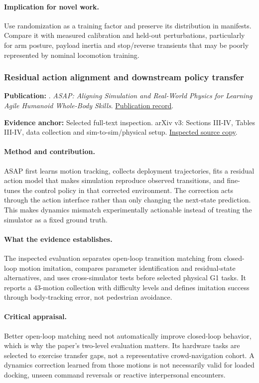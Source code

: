 \paragraph{Implication for novel work.} Use randomization as a training factor and preserve its distribution in manifests. Compare it with measured calibration and held-out perturbations, particularly for arm posture, payload inertia and stop/reverse transients that may be poorly represented by nominal locomotion training.

\subsubsection{Residual action alignment and downstream policy transfer}\label{paper:asap}
\textbf{Publication:} \citet{asap}. \emph{ASAP: Aligning Simulation and Real-World Physics for Learning Agile Humanoid Whole-Body Skills}. \href{https://arxiv.org/abs/2502.01143v3}{Publication record}.

\textbf{Evidence anchor:} Selected full-text inspection. arXiv v3: Sections III-IV, Tables III-IV, data collection and sim-to-sim/physical setup. \href{https://arxiv.org/pdf/2502.01143v3}{Inspected source copy}.

\paragraph{Method and contribution.} ASAP first learns motion tracking, collects deployment trajectories, fits a residual action model that makes simulation reproduce observed transitions, and fine-tunes the control policy in that corrected environment. The correction acts through the action interface rather than only changing the next-state prediction. This makes dynamics mismatch experimentally actionable instead of treating the simulator as a fixed ground truth.

\paragraph{What the evidence establishes.} The inspected evaluation separates open-loop transition matching from closed-loop motion imitation, compares parameter identification and residual-state alternatives, and uses cross-simulator tests before selected physical G1 tasks. It reports a 43-motion collection with difficulty levels and defines imitation success through body-tracking error, not pedestrian avoidance.

\paragraph{Critical appraisal.} Better open-loop matching need not automatically improve closed-loop behavior, which is why the paper's two-level evaluation matters. Its hardware tasks are selected to exercise transfer gaps, not a representative crowd-navigation cohort. A dynamics correction learned from those motions is not necessarily valid for loaded docking, unseen command reversals or reactive interpersonal encounters.

